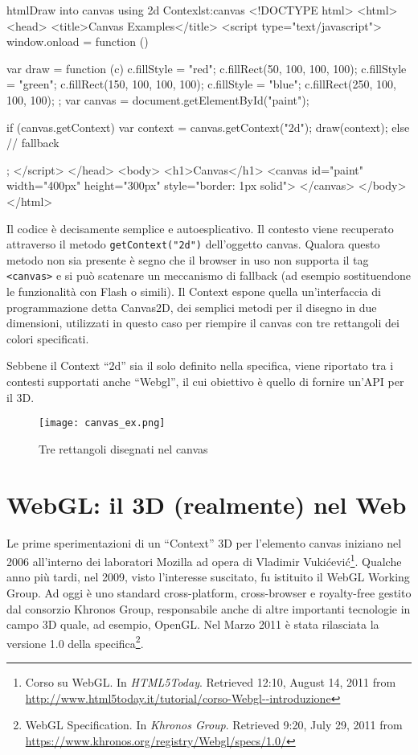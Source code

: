 \begin{mylisting}{html}{Draw into canvas using 2d Contex}{lst:canvas}
<!DOCTYPE html>
<html>
<head>
<title>Canvas Examples</title>
<script type="text/javascript">
window.onload = function () {
    var draw = function (c) {
        c.fillStyle = "red";
        c.fillRect(50, 100, 100, 100);
        c.fillStyle = "green";
        c.fillRect(150, 100, 100, 100);
        c.fillStyle = "blue";
        c.fillRect(250, 100, 100, 100);        
    };
    var canvas = document.getElementById("paint");

    if (canvas.getContext) {
        var context = canvas.getContext("2d");
        draw(context);
    } else {
        // fallback
    }
};    
</script>
</head>
<body>
    <h1>Canvas</h1>
    <canvas id="paint" width="400px" height="300px" style="border: 1px solid"> 
    </canvas>
</body>
</html>
\end{mylisting}

Il codice  è decisamente semplice e autoesplicativo. Il contesto viene recuperato attraverso il metodo \texttt{getContext("2d")} dell'oggetto canvas. Qualora questo metodo non sia presente è segno che il browser in uso non supporta il tag \texttt{<canvas>} e si può scatenare un meccanismo di fallback (ad esempio sostituendone le funzionalità con Flash o simili). Il Context espone quella un'interfaccia di programmazione detta Canvas2D, dei semplici metodi per il disegno in due dimensioni, utilizzati in questo caso per riempire il canvas con tre rettangoli dei colori specificati.

Sebbene il Context ``2d'' sia il solo definito nella specifica, viene riportato tra i contesti supportati anche ``Webgl'', il cui obiettivo è quello di fornire un'API per il 3D.

\begin{figure}[Ht]
\centering
\texttt{[image: canvas\_ex.png]}
\caption{Tre rettangoli disegnati nel canvas}
\label{label:canvasex}
\end{figure}

\section{WebGL: il 3D (realmente) nel Web}
Le prime sperimentazioni di un ``Context'' 3D per l'elemento canvas iniziano nel 2006 all'interno dei laboratori Mozilla ad opera di Vladimir Vukićević\footnote{Corso su WebGL. In \textit{HTML5Today}. Retrieved 12:10, August 14, 2011 from \url{http://www.html5today.it/tutorial/corso-Webgl--introduzione}}. Qualche anno più tardi, nel 2009, visto l'interesse suscitato, fu istituito il \mbox{WebGL} Working Group. Ad oggi è uno standard cross-platform, cross-browser e royalty-free gestito dal consorzio Khronos Group, responsabile anche di altre importanti tecnologie in campo 3D quale, ad esempio, OpenGL. Nel Marzo 2011 è stata rilasciata la versione 1.0 della specifica\footnote{WebGL Specification. In \textit{Khronos Group}. Retrieved 9:20, July 29, 2011 from \url{https://www.khronos.org/registry/Webgl/specs/1.0/}}.

